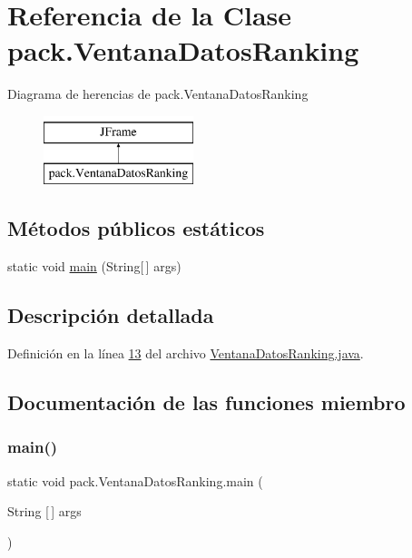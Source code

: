 \hypertarget{classpack_1_1_ventana_datos_ranking}{}\section{Referencia de la Clase pack.\+Ventana\+Datos\+Ranking}
\label{classpack_1_1_ventana_datos_ranking}
Diagrama de herencias de pack.\+Ventana\+Datos\+Ranking\begin{figure}[H]
\begin{center}
\leavevmode
\includegraphics[height=2.000000cm]{classpack_1_1_ventana_datos_ranking}
\end{center}
\end{figure}
\subsection*{Métodos públicos estáticos}
\begin{DoxyCompactItemize}
\item 
static void \mbox{\hyperlink{classpack_1_1_ventana_datos_ranking_a06ea40a113009655e16447faf02d1365}{main}} (String\mbox{[}$\,$\mbox{]} args)
\end{DoxyCompactItemize}


\subsection{Descripción detallada}


Definición en la línea \mbox{\hyperlink{_ventana_datos_ranking_8java_source_l00013}{13}} del archivo \mbox{\hyperlink{_ventana_datos_ranking_8java_source}{Ventana\+Datos\+Ranking.\+java}}.



\subsection{Documentación de las funciones miembro}
\mbox{\label{classpack_1_1_ventana_datos_ranking_a06ea40a113009655e16447faf02d1365}} 
\subsubsection{\texorpdfstring{main()}{main()}}
{\footnotesize\ttfamily static void pack.\+Ventana\+Datos\+Ranking.\+main (\begin{DoxyParamCaption}\item[{String \mbox{[}$\,$\mbox{]}}]{args }\end{DoxyParamCaption})\hspace{0.3cm}{\ttfamily [static]}}

